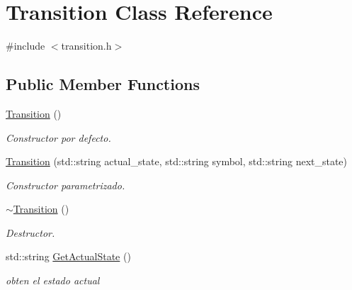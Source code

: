 \hypertarget{classTransition}{}\section{Transition Class Reference}
\label{classTransition}


{\ttfamily \#include $<$transition.\+h$>$}

\subsection*{Public Member Functions}
\begin{DoxyCompactItemize}
\item 
\hyperlink{classTransition_a73b44b2338b11807f77b620a3e810f92}{Transition} ()
\begin{DoxyCompactList}\small\item\em Constructor por defecto. \end{DoxyCompactList}\item 
\mbox{\label{classTransition_ace14152c505810535ce6c2166a92582f}} 
\hyperlink{classTransition_ace14152c505810535ce6c2166a92582f}{Transition} (std\+::string actual\+\_\+state, std\+::string symbol, std\+::string next\+\_\+state)
\begin{DoxyCompactList}\small\item\em Constructor parametrizado. \end{DoxyCompactList}\item 
\mbox{\label{classTransition_ab66e8623f23c71cd4f07c69596427bab}} 
\hyperlink{classTransition_ab66e8623f23c71cd4f07c69596427bab}{$\sim$\+Transition} ()
\begin{DoxyCompactList}\small\item\em Destructor. \end{DoxyCompactList}\item 
\mbox{\label{classTransition_af562921b1f4c018dbd23175f068177dd}} 
std\+::string \hyperlink{classTransition_af562921b1f4c018dbd23175f068177dd}{Get\+Actual\+State} ()
\begin{DoxyCompactList}\small\item\em obten el estado actual \end{DoxyCompactList}\item 
\mbox{\label{classTransition_a3ffdd67d98d0c6158c73b691f10e4392}} 

\end{DoxyCompactItemize}
